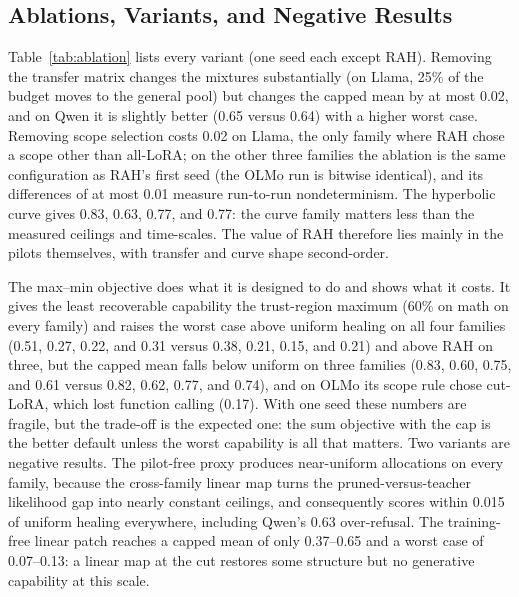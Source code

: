 \documentclass{ieeeaccess}
\newcommand{\RAH}{RAH}
\begin{document}
\subsection{Ablations, Variants, and Negative Results}
Table~\ref{tab:ablation} lists every variant (one seed each except \RAH). Removing the transfer matrix changes the mixtures substantially (on Llama, 25\% of the budget moves to the general pool) but changes the capped mean by at most 0.02, and on Qwen it is slightly better (0.65 versus 0.64) with a higher worst case. Removing scope selection costs 0.02 on Llama, the only family where \RAH{} chose a scope other than all-LoRA; on the other three families the ablation is the same configuration as \RAH's first seed (the OLMo run is bitwise identical), and its differences of at most 0.01 measure run-to-run nondeterminism. The hyperbolic curve gives 0.83, 0.63, 0.77, and 0.77: the curve family matters less than the measured ceilings and time-scales. The value of \RAH{} therefore lies mainly in the pilots themselves, with transfer and curve shape second-order.

The max--min objective does what it is designed to do and shows what it costs. It gives the least recoverable capability the trust-region maximum (60\% on math on every family) and raises the worst case above uniform healing on all four families (0.51, 0.27, 0.22, and 0.31 versus 0.38, 0.21, 0.15, and 0.21) and above \RAH{} on three, but the capped mean falls below uniform on three families (0.83, 0.60, 0.75, and 0.61 versus 0.82, 0.62, 0.77, and 0.74), and on OLMo its scope rule chose cut-LoRA, which lost function calling (0.17). With one seed these numbers are fragile, but the trade-off is the expected one: the sum objective with the cap is the better default unless the worst capability is all that matters. Two variants are negative results. The pilot-free proxy produces near-uniform allocations on every family, because the cross-family linear map turns the pruned-versus-teacher likelihood gap into nearly constant ceilings, and consequently scores within 0.015 of uniform healing everywhere, including Qwen's 0.63 over-refusal. The training-free linear patch reaches a capped mean of only 0.37--0.65 and a worst case of 0.07--0.13: a linear map at the cut restores some structure but no generative capability at this scale.

\begin{table}[t]
\caption{Ablations, variants, and the training-free baseline (one seed each; \RAH{} with three seeds for reference). The mixture lists the percentage of the budget given to each pool.}
\label{tab:ablation}
\centering\footnotesize
\setlength{\tabcolsep}{4pt}

\end{table}
\end{document}
